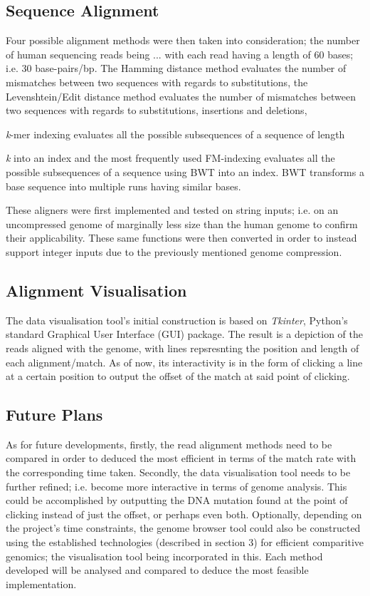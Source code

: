 \documentclass{csfyp}
\begin{document}
\subsection{Sequence Alignment}\vspace{-2ex}
Four possible alignment methods were then taken into consideration; the number of human sequencing reads being ... with each read having a length of 60 bases; i.e. 30 base-pairs/bp.  The Hamming distance method evaluates the number of mismatches between two sequences with regards to substitutions,  the Levenshtein/Edit distance method evaluates the number of mismatches between two sequences with regards to substitutions, insertions and deletions,  {\textit{k}-mer indexing evaluates all the possible subsequences of a sequence of length {\textit{k} into an index and the most frequently used FM-indexing evaluates all the possible subsequences of a sequence using BWT into an index.  BWT transforms a base sequence into multiple runs having similar bases.  

These aligners were first implemented and tested on string inputs; i.e. on an uncompressed genome of marginally less size than the human genome to confirm their applicability.  These same functions were then converted in order to instead support integer inputs due to the previously mentioned genome compression.    

\subsection{Alignment Visualisation}\vspace{-2ex}
The data visualisation tool's initial construction is based on {\textit{Tkinter}}, Python's standard Graphical User Interface (GUI) package.  The result is a depiction of the reads aligned with the genome, with lines repsresnting the position and length of each alignment/match.  As of now, its interactivity is in the form of clicking a line at a certain position to output the offset of the match at said point of clicking.     

\subsection{Future Plans}\vspace{-2ex}
As for future developments, firstly, the read alignment methods need to be compared in order to deduced the most efficient in terms of the match rate with the corresponding time taken.  
Secondly, the data visualisation tool needs to be further refined; i.e. become more interactive in terms of genome analysis.  This could be accomplished by outputting the DNA mutation found at the point of clicking instead of just the offset, or perhaps even both.       
Optionally, depending on the project's time constraints, the genome browser tool could also be constructed using the established technologies (described in section 3) for efficient comparitive genomics; the visualisation tool being incorporated in this.  Each method developed will be analysed and compared to deduce the most feasible implementation.   


}}
\end{document}
